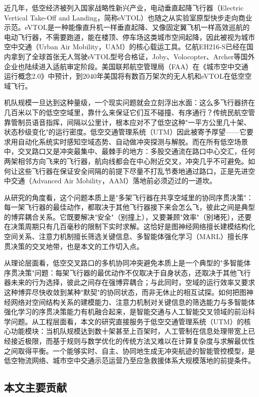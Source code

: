 \documentclass[12pt,a4paper,UTF8]{ctexart}
\begin{document}
近几年，低空经济被列入国家战略性新兴产业，电动垂直起降飞行器（Electric Vertical Take-Off and Landing，简称eVTOL）也随之从实验室原型快步走向商业示范。eVTOL是一种能像直升机一样垂直起降、又像固定翼飞机一样高效巡航的电动飞行器，不需要跑道，能在楼顶、停车场这类城市空间起降，因此被视为城市空中交通（Urban Air Mobility，UAM）\cite{ref45}的核心载运工具。亿航EH216-S已经在国内拿到了全球首张无人驾驶eVTOL型号合格证，Joby、Volocopter、Archer等国外企业也陆续进入适航审定阶段。美国联邦航空管理局（FAA）在《城市空中交通运行概念2.0》中预计，到2040年美国将有数百万架次的无人机和eVTOL在低空空域飞行\cite{ref1}。

机队规模一旦达到这种量级，一个现实问题就会立刻浮出水面：这么多飞行器挤在几百米以下的低空空域里，靠什么来保证它们互不碰撞、有序通行？传统民航空管靠管制员语音指挥，间隔以公里计，根本应对不了低空这种"一平方公里几十架、状态秒级变化"的运行密度。低空交通管理系统（UTM）因此被寄予厚望——它要求用自动化系统实时感知空域态势、自动做冲突探测与解脱。而在所有低空场景中，交叉路口又是冲突最集中、最棘手的地方：多股交通流在路口中心交汇，任何两架相邻方向飞来的飞行器，航向线都会在中心附近交叉，冲突几乎不可避免。如何让这些飞行器在保证安全间隔的前提下尽量不打乱节奏地通过路口，正是先进空中交通（Advanced Air Mobility，AAM）落地前必须迈过的一道坎。

从研究的角度看，这个问题本质上是"多架飞行器在共享空域里的协同序贯决策"：每一架飞行器的最佳动作，都取决于其他飞行器接下来会怎么飞，彼此之间是典型的博弈耦合关系。它既要解决"安全"（别撞上），又要兼顾"效率"（别堵死），还要在决策周期只有几百毫秒的限制下实时求解。这恰好是图神经网络擅长建模结构化空间关系、注意力机制擅长筛选关键信息、多智能体强化学习（MARL）擅长序贯决策的交叉地带，也是本文的工作切入点。

从理论层面看，低空交叉路口的多机协同冲突避免本质上是一个典型的"多智能体序贯决策"问题：每架飞行器的最优动作不仅取决于自身状态，还取决于其他飞行器未来的行为选择，彼此之间存在强博弈耦合；与此同时，空域的运行效率又要求这种博弈尽快收敛到某种"默契"的协同状态，而非无休止的相互试探。如何把图神经网络对空间结构关系的建模能力、注意力机制对关键信息的筛选能力与多智能体强化学习的序贯决策能力有机融合起来，是智能交通与人工智能交叉领域的前沿科学问题。从工程层面看，本文的研究直接服务于低空交通管理系统（UTM）的核心功能模块：当机队规模达到数十架甚至上百架时，人工管制在信息处理带宽上已经接近极限，而基于规则与数学优化的传统方法又难以在计算复杂度与求解最优性之间取得平衡。一个能够实时、自主、协同地生成无冲突航迹的智能管控模型，是低空物流网络、城市空中交通示范运营乃至应急救援体系大规模落地的前提条件。

\subsection{本文主要贡献}
\end{document}
